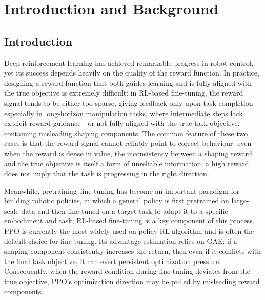 \chapter{Introduction and Background} \label{Chap2}

\section{Introduction}

Deep reinforcement learning has achieved remarkable progress in robot control, yet its success depends heavily on the quality of the reward function. In practice, designing a reward function that both guides learning and is fully aligned with the true objective is extremely difficult\cite{ibrahim2024comprehensive}: in RL-based fine-tuning, the reward signal tends to be either too sparse, giving feedback only upon task completion\cite{andrychowicz2017hindsight}---especially in long-horizon manipulation tasks, where intermediate steps lack explicit reward guidance\cite{wang2022learning,yang2026actor}---or not fully aligned with the true task objective, containing misleading shaping components\cite{karwowski2024goodhart}. The common feature of these two cases is that the reward signal cannot reliably point to correct behaviour: even when the reward is dense in value, the inconsistency between a shaping reward and the true objective is itself a form of unreliable information; a high reward does not imply that the task is progressing in the right direction.

Meanwhile, pretraining--fine-tuning has become an important paradigm for building robotic policies\cite{firoozi2025foundation}, in which a general policy is first pretrained on large-scale data and then fine-tuned on a target task to adapt it to a specific embodiment and task; RL-based fine-tuning is a key component of this process. PPO\cite{schulman2017proximal} is currently the most widely used on-policy RL algorithm and is often the default choice for fine-tuning. Its advantage estimation relies on GAE\cite{schulman2015high}: if a shaping component consistently increases the return, then even if it conflicts with the final task objective, it can exert persistent optimization pressure. Consequently, when the reward condition during fine-tuning deviates from the true objective, PPO's optimization direction may be pulled by misleading reward components.

